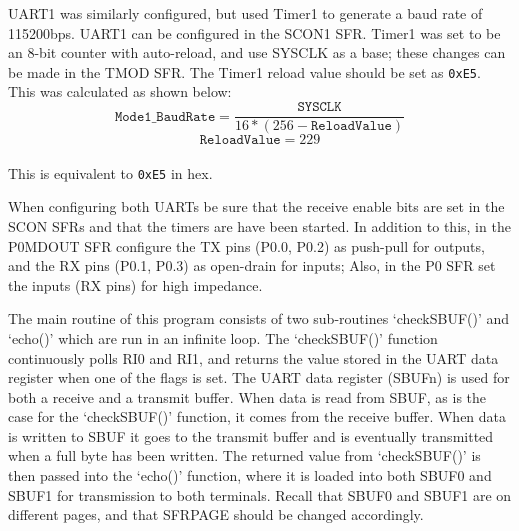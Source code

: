 \documentclass[12pt]{article}
\begin{document}
UART1 was similarly configured, but used Timer1 to generate a baud rate of \si{115200}{bps}. UART1 can be configured in the SCON1 SFR. Timer1 was set to be an 8-bit counter with auto-reload, and use SYSCLK as a base; these changes can be made in the TMOD SFR. The Timer1 reload value should be set as \texttt{0xE5}. This was calculated as shown below:\\ 
\begin{equation}
\mathtt{Mode1\_BaudRate} = \frac{\mathtt{SYSCLK}}{16*(256-\mathtt{ReloadValue})}
\end{equation}
\begin{equation}
\mathtt{ReloadValue} = 229
\end{equation}\\
This is equivalent to \texttt{0xE5} in hex.

When configuring both UARTs be sure that the receive enable bits are set in the SCON SFRs and that the timers are have been started. In addition to this, in the P0MDOUT SFR configure the TX pins (P0.0, P0.2) as push-pull for outputs, and the RX pins (P0.1, P0.3) as open-drain for inputs; Also, in the P0 SFR set the inputs (RX pins) for high impedance. 

The main routine of this program consists of two sub-routines `checkSBUF()' and `echo()' which are run in an infinite loop. The `checkSBUF()' function continuously polls RI0 and RI1, and returns the value stored in the UART data register when one of the flags is set. The UART data register (SBUFn) is used for both a receive and a transmit buffer. When data is read from SBUF, as is the case for the `checkSBUF()' function, it comes from the receive buffer. When data is written to SBUF it goes to the transmit buffer and is eventually transmitted when a full byte has been written. The returned value from `checkSBUF()' is then passed into the `echo()' function, where it is loaded into both SBUF0 and SBUF1 for transmission to both terminals. Recall that SBUF0 and SBUF1 are on different pages, and that SFRPAGE should be changed accordingly. 
\end{document}
